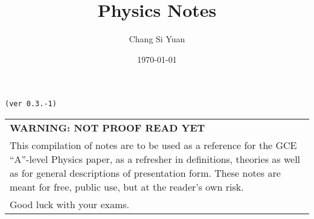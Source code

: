 \documentclass[../main]{subfiles}
\begin{document}
\author{Chang Si Yuan}
\title{Physics Notes}
\date{\today}

\maketitle

\begin{center}

	\texttt{(ver 0.3.-1)}

	\vspace{50pt}

	\begin{tabular}{>{\flushleft}p{8cm}}
	\textbf{WARNING: NOT PROOF READ YET} \\
	This compilation of notes are to be used as a reference for the GCE ``A''-level Physics paper, as a refresher in definitions, theories as well as for general descriptions of presentation form. These notes are meant for free, public use, but at the reader's own risk. \\
	Good luck with your exams.
	\end{tabular}

	\vspace{50pt}

\end{center}

\newpage
\end{document}
